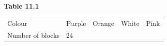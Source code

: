 \begin{enumerate}[noitemsep, label=\textbf{\arabic*}. ]
{{\begin{center}
\begin{tabular}[t]{|l|l|l|l|l|}
     \tabularnewline\cline{1-1}\cline{2-2}\cline{3-3}\cline{4-4}\cline{5-5}
    \end{tabular}
      \end{center}
    \begin{center}{\small\bfseries Table 11.1}\end{center}
          }{ %
        \begin{center}
      \label{m39377*id114946}
    \noindent
      \tablelasttail{}
      \begin{xtabular}[t]{|l|l|l|l|l|}\hline
        Colour &
        Purple &
        Orange &
        White &
        Pink%
     \tabularnewline{}
        Number of
blocks &
        24 &

\end{xtabular}
\end{center}}}
\end{enumerate}
